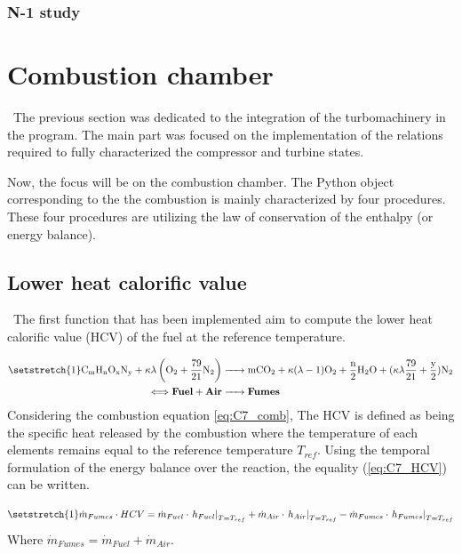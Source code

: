 \subsubsection{N-1 study}

\section{Combustion chamber}
\quad\ The previous section was dedicated to the integration of the turbomachinery in the program. The main part was focused on the implementation of the relations required to fully characterized the compressor and turbine states.

Now, the focus will be on the combustion chamber. The Python object corresponding to the the combustion is mainly characterized by four procedures. These four procedures are utilizing the law of conservation of the enthalpy (or energy balance).

\subsection{Lower heat calorific value}
\quad\ The first function that has been implemented aim to compute the lower heat calorific value (HCV) of the fuel at the reference temperature. 

\begin{align}
    \setstretch{1}
    \ce{C_{\text{m}}H_{\text{n}}O_{\text{x}}N_{\text{y}} +}\kappa\lambda \left(\ce{O2}+\frac{79}{21}\ce{N2}\right) &\ce{-> mCO2 +} \kappa(\lambda-1)\ce{O2 + \frac{n}{2}H2O +} (\kappa\lambda\frac{79}{21} + \frac{\text{y}}{2})\ce{N2} \label{eq:C7_comb}\\
    \Longleftrightarrow \textbf{Fuel} + \textbf{Air} &\ce{->} \textbf{Fumes}\nonumber
\end{align}
Considering the combustion equation \ref{eq:C7_comb}, The HCV is defined as being the specific heat released by the combustion where the temperature of each elements remains equal to the reference temperature $T_{ref}$. Using the temporal formulation of the energy balance over the reaction, the equality (\ref{eq:C7_HCV}) can be written.

\begin{equation}
    \setstretch{1}
    \dot{m}_{Fumes}\cdot HCV = \dot{m}_{Fuel}\cdot \left.h_{Fuel}\right|_{T=T_{ref}} + \dot{m}_{Air}\cdot \left.h_{Air}\right|_{T=T_{ref}} - \dot{m}_{Fumes}\cdot \left.h_{Fumes}\right|_{T=T_{ref}}\label{eq:C7_HCV}
\end{equation}
Where $\dot{m}_{Fumes} = \dot{m}_{Fuel} + \dot{m}_{Air}$.

